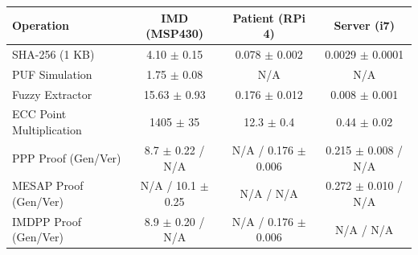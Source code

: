 \begin{tabular}{l|c|c|c}
\toprule
\textbf{Operation} & \textbf{IMD (MSP430)} & \textbf{Patient (RPi 4)} & \textbf{Server (i7)} \\
\midrule
SHA-256 (1 KB) & 4.10 $\pm$ 0.15 & 0.078 $\pm$ 0.002 & 0.0029 $\pm$ 0.0001 \\
PUF Simulation & 1.75 $\pm$ 0.08 & N/A & N/A \\
Fuzzy Extractor & 15.63 $\pm$ 0.93 & 0.176 $\pm$ 0.012 & 0.008 $\pm$ 0.001 \\
ECC Point Multiplication & 1405 $\pm$ 35 & 12.3 $\pm$ 0.4 & 0.44 $\pm$ 0.02 \\
PPP Proof (Gen/Ver) & 8.7 $\pm$ 0.22 / N/A & N/A / 0.176 $\pm$ 0.006 & 0.215 $\pm$ 0.008 / N/A \\
MESAP Proof (Gen/Ver) & N/A / 10.1 $\pm$ 0.25 & N/A / N/A & 0.272 $\pm$ 0.010 / N/A \\
IMDPP Proof (Gen/Ver) & 8.9 $\pm$ 0.20 / N/A & N/A / 0.176 $\pm$ 0.006 & N/A / N/A \\
\bottomrule
\end{tabular}
